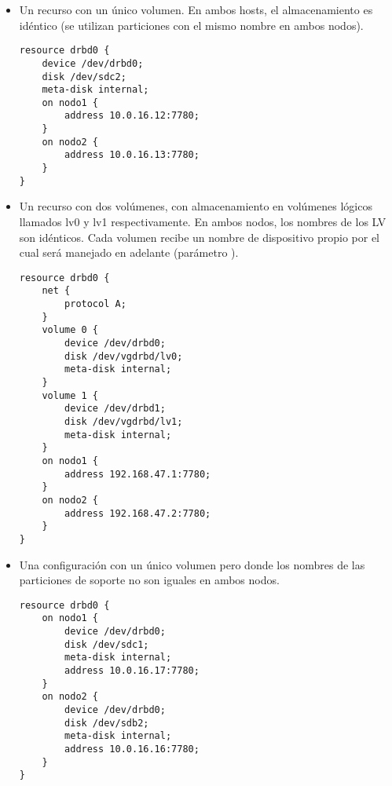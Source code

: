 \begin{itemize}
	\item Un recurso con un único volumen. En ambos hosts, el almacenamiento es idéntico (se utilizan particiones con el mismo nombre en ambos nodos).
\begin{lstlisting}
resource drbd0 {
	device /dev/drbd0;
	disk /dev/sdc2;
	meta-disk internal;
	on nodo1 {
		address 10.0.16.12:7780;
	}
	on nodo2 {
		address 10.0.16.13:7780;
	}
}
\end{lstlisting}

\item Un recurso con dos volúmenes, con almacenamiento en volúmenes lógicos llamados lv0 y lv1 respectivamente. En ambos nodos, los nombres de los LV son idénticos. Cada volumen recibe un nombre de dispositivo propio por el cual será manejado en adelante (parámetro ).

\begin{lstlisting}
resource drbd0 {
	net {
		protocol A;
	}
	volume 0 {
		device /dev/drbd0;
		disk /dev/vgdrbd/lv0;
		meta-disk internal;
	}
	volume 1 {
		device /dev/drbd1;
		disk /dev/vgdrbd/lv1;
		meta-disk internal;
	}
	on nodo1 {
		address	192.168.47.1:7780;
	}
	on nodo2 {
		address	192.168.47.2:7780;
	}
}
\end{lstlisting}
\item Una configuración con un único volumen pero donde los nombres de las particiones de soporte no son iguales en ambos nodos.
\begin{lstlisting}
resource drbd0 {
	on nodo1 {
		device /dev/drbd0;
		disk /dev/sdc1;
        meta-disk internal;
		address 10.0.16.17:7780;
	}
	on nodo2 {
		device /dev/drbd0;
        disk /dev/sdb2;
        meta-disk internal;
		address 10.0.16.16:7780;
	}
}
\end{lstlisting}
\end{itemize}
